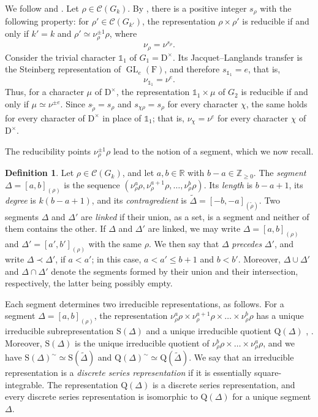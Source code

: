 \documentclass[11pt]{amsart}
\numberwithin{equation}{section}
\theoremstyle{plain}
\theoremstyle{definition}
\newtheorem{definition}[theorem]{Definition}
\theoremstyle{remark}
\newcommand{\R}{\mathbb{R}}
\newcommand{\Z}{\mathbb{Z}}
\newcommand{\one}{\mathds{1}}
\DeclareMathOperator{\GL}{GL}
\newcommand{\Ss}{\mathrm{S}}
\newcommand{\Qq}{\mathrm{Q}}
\begin{document}
We follow \cite[\S3]{LM16} and \cite{Tad90}. Let $\rho\in\mathcal C(G_k)$. By \cite[\S3.1 and Appendix A]{LM16}, there is a positive integer $s_\rho$ with the following property: for $\rho'\in\mathcal C(G_{k'})$, the representation $\rho\times\rho'$ is reducible if and only if $k'=k$ and $\rho'\simeq\nu_\rho^{\pm1}\rho$, where
$$
\nu_\rho=\nu^{s_\rho}.
$$
Consider the trivial character $\one_1$ of $G_1=\mathrm{D}^\times$. Its Jacquet--Langlands transfer is the Steinberg representation of $\GL_e(\mathrm{F})$, and therefore $s_{\one_1}=e$, that is,
$$
\nu_{\one_1}=\nu^e .
$$
Thus, for a character $\mu$ of $\mathrm{D}^\times$, the representation $\one_1\times\mu$ of $G_2$ is reducible if and only if $\mu\simeq\nu^{\pm e}$. Since $s_{\widetilde\rho}=s_\rho$ and $s_{\chi\rho}=s_\rho$ for every character $\chi$, the same holds for every character of $\mathrm{D}^\times$ in place of $\one_1$; that is, $\nu_\chi=\nu^e$ for every character $\chi$ of $\mathrm{D}^\times$.

The reducibility points $\nu_\rho^{\pm1}\rho$ lead to the notion of a segment, which we now recall.

\begin{definition}
	Let $\rho\in\mathcal C(G_k)$, and let $a,b\in\R$ with $b-a\in\Z_{\ge0}$. The \emph{segment} $\Delta=[a,b]_{(\rho)}$ is the sequence $(\nu_\rho^a\rho,\nu_\rho^{a+1}\rho,\dots,\nu_\rho^b\rho)$. Its \emph{length} is $b-a+1$, its \emph{degree} is $k(b-a+1)$, and its \emph{contragredient} is $\widetilde\Delta=[-b,-a]_{(\widetilde\rho)}$. Two segments $\Delta$ and $\Delta'$ are \emph{linked} if their union, as a set, is a segment and neither of them contains the other. If $\Delta$ and $\Delta'$ are linked, we may write $\Delta=[a,b]_{(\rho)}$ and $\Delta'=[a',b']_{(\rho)}$ with the same $\rho$. We then say that $\Delta$ \emph{precedes} $\Delta'$, and write $\Delta\prec\Delta'$, if $a<a'$; in this case, $a<a'\le b+1$ and $b<b'$. Moreover, $\Delta\cup\Delta'$ and $\Delta\cap\Delta'$ denote the segments formed by their union and their intersection, respectively, the latter being possibly empty.
\end{definition}

Each segment determines two irreducible representations, as follows. For a segment $\Delta=[a,b]_{(\rho)}$, the representation $\nu_\rho^a\rho\times\nu_\rho^{a+1}\rho\times\dots\times\nu_\rho^b\rho$ has a unique irreducible subrepresentation $\Ss(\Delta)$ and a unique irreducible quotient $\Qq(\Delta)$ \cite[\S3]{LM16}, \cite{Tad90}. Moreover, $\Ss(\Delta)$ is the unique irreducible quotient of $\nu_\rho^b\rho\times\dots\times\nu_\rho^a\rho$, and we have $\Ss(\Delta)^\sim\simeq\Ss(\widetilde\Delta)$ and $\Qq(\Delta)^\sim\simeq\Qq(\widetilde\Delta)$. We say that an irreducible representation is a \emph{discrete series representation} if it is essentially square-integrable. The representation $\Qq(\Delta)$ is a discrete series representation, and every discrete series representation is isomorphic to $\Qq(\Delta)$ for a unique segment $\Delta$.
\end{document}
